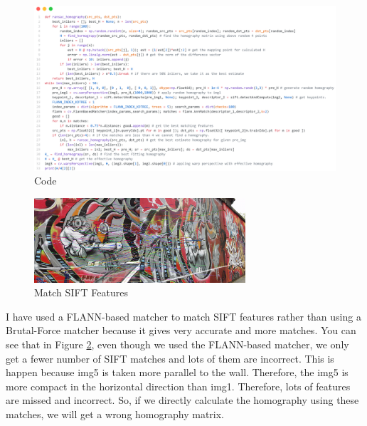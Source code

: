 \documentclass[a4paper]{article}
\begin{document}
\begin{figure}[!htb]
  \centering
  \includegraphics[width=\textwidth]{images/q3code.png}
  \caption{Code}
  \label{q3code}
\end{figure}
\begin{figure}[!htb]
  \centering
  \includegraphics[width=0.7\textwidth]{images/stif.png}
  \caption{Match SIFT Features}
  \label{sift}
\end{figure}
I have used a FLANN-based matcher to match SIFT features rather
 than using a Brutal-Force matcher because it gives very accurate
  and more matches. You can see that in Figure \ref{sift},  even though we
   used the FLANN-based matcher, we only get a fewer number of SIFT
    matches and lots of them are incorrect. This is happen because
     img5 is taken more parallel to the wall. Therefore, the img5
      is more compact in the horizontal direction than img1.
       Therefore, lots of features are missed and incorrect.
        So, if we directly calculate the homography using these 
        matches, we will get a wrong homography matrix.
  
\end{document}
